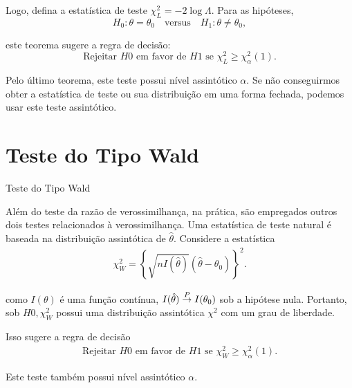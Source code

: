 \documentclass[12pt]{beamer}
\begin{document}
\begin{frame}{}
\begin{block}{}
\justifying
Logo, defina a estatística de teste $\chi^2_L = -2 \log \Lambda.$ Para as hipóteses, 
\[ H_0 : \theta = \theta_0 \quad \text{versus} \quad H_1 : \theta \neq \theta_0, \]

este teorema sugere a regra de decisão:
\[
\text{Rejeitar } H0 \text{ em favor de } H1 \text{ se } \chi^2_L \geq \chi^2_\alpha(1).
\]

Pelo último teorema, este teste possui nível assintótico $\alpha.$ Se não conseguirmos obter a estatística de teste ou sua distribuição em uma forma fechada, podemos usar este teste assintótico.
\end{block}
\end{frame}

\section{Teste do Tipo Wald}
\begin{frame}{Teste do Tipo Wald}
\begin{block}{}
\justifying
Além do teste da razão de verossimilhança, na prática, são empregados outros dois testes relacionados à verossimilhança. Uma estatística de teste natural é baseada na distribuição assintótica de $\hat{\theta}$. Considere a estatística
\begin{align*}
    \chi^2_W = \left\{\sqrt{nI(\hat{\theta})}(\hat{\theta} - \theta_0)\right\}^2.
\end{align*}

como $I(\theta)$ é uma função contínua, $I(\hat{\theta}) \overset{P}{\rightarrow} I(\theta_0)$ sob a hipótese nula. Portanto, sob $H0, \chi^2_W$ possui uma distribuição assintótica $\chi^2$ com um grau de liberdade. 
\end{block}
\pause
\begin{block}{}
\justifying
Isso sugere a regra de decisão
\begin{align}\label{6.3.14}
    \text{Rejeitar } H0 \text{ em favor de } H1 \text{ se } \chi^2_W \geq \chi^2_\alpha(1).
\end{align}

Este teste também possui nível assintótico $\alpha.$
\end{block}
\end{frame}
\end{document}

